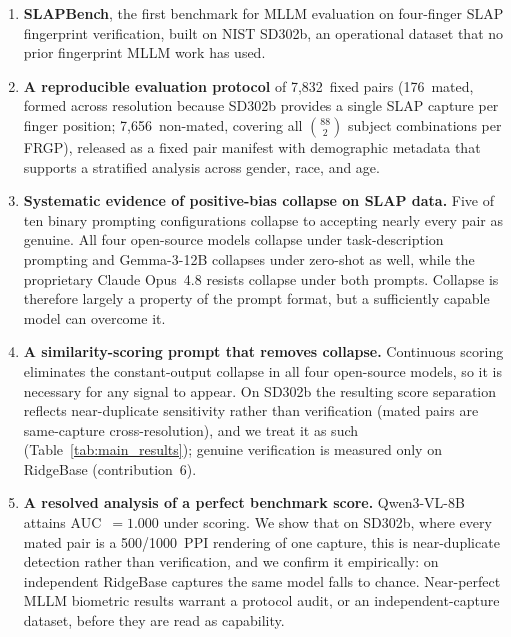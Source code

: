 \documentclass[journal]{IEEEtran}
\begin{document}
\begin{enumerate}
  \item \textbf{SLAPBench}, the first benchmark for MLLM evaluation on
        four-finger SLAP fingerprint verification, built on NIST SD302b, an
        operational dataset that no prior fingerprint MLLM work has used.

  \item \textbf{A reproducible evaluation protocol} of 7,832~fixed pairs
        (176~mated, formed across resolution because SD302b provides a
        single SLAP capture per finger position; 7,656~non-mated, covering
        all $\binom{88}{2}$ subject combinations per FRGP), released as a
        fixed pair manifest with demographic metadata that supports a
        stratified analysis across gender, race, and age.

  \item \textbf{Systematic evidence of positive-bias collapse on SLAP data.}
        Five of ten binary prompting configurations collapse to accepting
        nearly every pair as genuine. All four open-source models collapse
        under task-description prompting and Gemma-3-12B collapses under
        zero-shot as well, while the proprietary Claude Opus~4.8 resists
        collapse under both prompts. Collapse is therefore largely a
        property of the prompt format, but a sufficiently capable model can
        overcome it.

  \item \textbf{A similarity-scoring prompt that removes collapse.}
        Continuous scoring eliminates the constant-output collapse in all four
        open-source models, so it is necessary for any signal to appear. On
        SD302b the resulting score separation reflects near-duplicate
        sensitivity rather than verification (mated pairs are same-capture
        cross-resolution), and we treat it as such
        (Table~\ref{tab:main_results}); genuine verification is measured only on
        RidgeBase (contribution~6).

  \item \textbf{A resolved analysis of a perfect benchmark score.}
        Qwen3-VL-8B attains AUC~$= 1.000$ under scoring. We show that on SD302b,
        where every mated pair is a 500/1000~PPI rendering of one capture, this
        is near-duplicate detection rather than verification, and we confirm it
        empirically: on independent RidgeBase captures the same model falls to
        chance. Near-perfect MLLM biometric results warrant a protocol audit,
        or an independent-capture dataset, before they are read as capability.


\end{enumerate}
\end{document}
